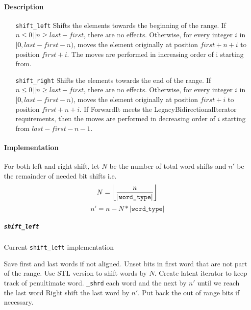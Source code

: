 \documentclass[letterpaper, 8pt, twocolumn]{article}
\DeclarePairedDelimiter\floor{\lfloor}{\rfloor}
\begin{document}
\paragraph{Description}
\begin{itemize}
    \item[\texttt{shift\_left}] Shifts the elements towards the beginning of the 
            range. If $n \leq 0 || n \geq last - first$, there are no effects. 
            Otherwise, for every integer $i$ in $[0, last - first - n)$, moves the 
            element originally at position $first + n + i$ to position $first + i$. 
            The moves are performed in increasing order of i starting from.
    \item[\texttt{shift\_right}] Shifts the elements towards the end of the 
        range. If $n \leq 0 || n \geq last - first$, there are no effects. Otherwise, 
        for every integer $i$ in $[0, last - first - n)$, moves the element 
        originally at position $first + i$ to position $first + n + i$. If ForwardIt 
        meets the LegacyBidirectionalIterator requirements, then the moves are 
        performed in decreasing order of $i$ starting from $last - first - n - 1$.
\end{itemize}

\paragraph{Implementation}
For both left and right shift, let $N$ be the number of total word shifts and 
$n'$ be the remainder of needed bit shifts i.e.
$$N=\floor*{\frac{n}{|\texttt{word\_type}|}}$$ $$n'=n-N*|\texttt{word\_type}|$$
\subparagraph{\texttt{shift\_left}}

\begin{algorithm}[H]
    \caption{Current \texttt{shift\_left} implementation}
    \begin{algorithmic}[1]
            \State Save first and last words if not aligned.
            \State Unset bits in first word that are not part of 
            the range.
            \State Use STL version to shift words by $N$.
            \State Create latent iterator to keep track of penultimate word.
            \State \texttt{\_shrd} each word and the next by $n'$ until we 
            reach the last word
            \State Right shift the last word by $n'$.
            \State Put back the out of range bits if necessary.
        \EndFunction
    \end{algorithmic}
\end{algorithm}
\end{document}
